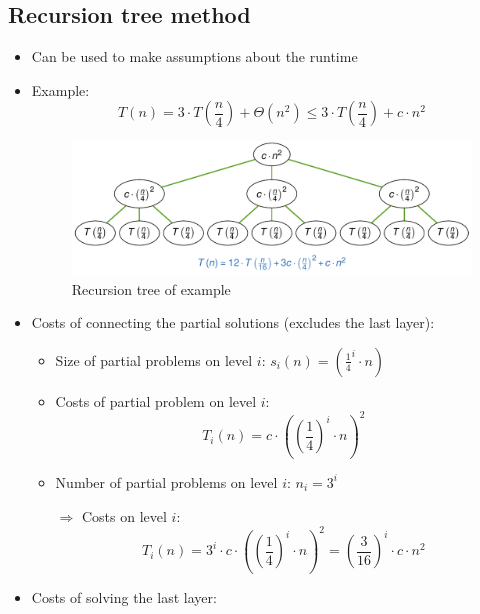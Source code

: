 \documentclass[12pt, a4paper]{scrartcl}
\renewcommand{\implies}{\Rightarrow}
\newcommand{\imgwidth}{.7\textwidth}
\begin{document}
\subsection{Recursion tree method}
\label{sec:recursion_tree_method}
\begin{itemize}
\item Can be used to make assumptions about the runtime
\item Example:
  \begin{equation*}
    T(n)=3\cdot T
    \left(
      \frac{n}{4}
    \right)
    +\Theta(n^2)\le 3\cdot T
      \left(
        \frac{n}{4}
      \right)+c\cdot n^2
  \end{equation*}
\begin{figure}[htbp]
  \centering
  \includegraphics[width=\imgwidth]{recursion_tree_example}
  \caption{Recursion tree of example}
  \label{fig:recursion_tree_example}
\end{figure}
\item Costs of connecting the partial solutions (excludes the last layer):
  \begin{itemize}
  \item Size of partial problems on level $i$: $s_i(n)=
    \left(
      \frac{1}{4}^i\cdot n
    \right)$
  \item Costs of partial problem on level $i$:
    \begin{equation*}
      T_i(n) = c\cdot
      \left(
        \left( \frac{1}{4} \right)^i\cdot n
      \right)^2
    \end{equation*}
  \item Number of partial problems on level $i$: $n_i=3^i$
  \item[$\implies$] Costs on level $i$:
    \begin{equation*}
      T_i(n)=3^i\cdot c\cdot \left( \left( \frac{1}{4} \right)^i\cdot n \right)^2=
      \left( \frac{3}{16} \right)^i\cdot c\cdot n^2
    \end{equation*}
  \end{itemize}
\item Costs of solving the last layer:

\end{itemize}
\end{document}
